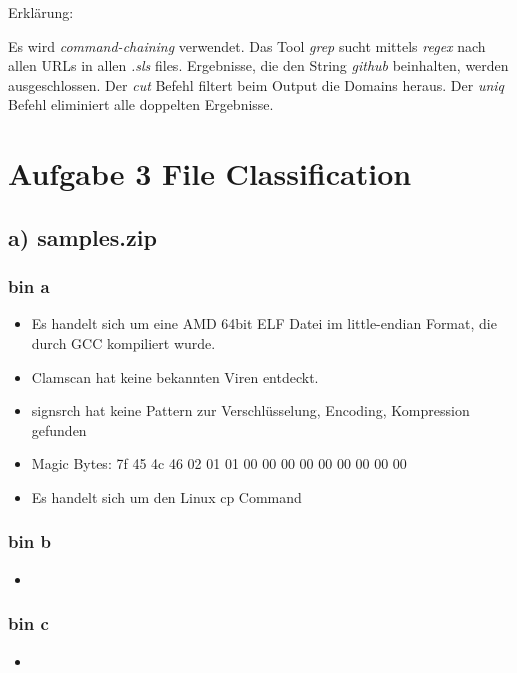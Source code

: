 Erklärung:

Es wird \textit{command-chaining} verwendet.
Das Tool \textit{grep} sucht mittels \textit{regex} nach allen URLs in allen \textit{.sls} files.
Ergebnisse, die den String \textit{github} beinhalten, werden ausgeschlossen.
Der \textit{cut} Befehl filtert beim Output die Domains heraus.
Der \textit{uniq} Befehl eliminiert alle doppelten Ergebnisse.

\section*{Aufgabe 3 File Classification}

\subsection*{a) samples.zip}

\subsubsection*{bin a}

\begin{itemize}
    \item Es handelt sich um eine AMD 64bit ELF Datei im little-endian Format, die durch GCC kompiliert wurde.
    \item Clamscan hat keine bekannten Viren entdeckt.
    \item signsrch hat keine Pattern zur Verschlüsselung, Encoding, Kompression gefunden
    \item Magic Bytes: 7f 45 4c 46 02 01 01 00 00 00 00 00 00 00 00 00
    \item Es handelt sich um den Linux cp Command
\end{itemize}

\subsubsection*{bin b}

\begin{itemize}
    \item
\end{itemize}

\subsubsection*{bin c}

\begin{itemize}
    \item
\end{itemize}

